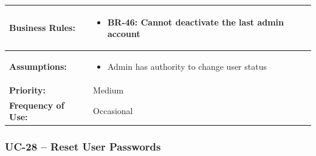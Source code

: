 \documentclass[12pt,a4paper]{article}
\begin{document}
\begin{longtable}{|p{4.5cm}|p{10.5cm}|}
\hline
\textbf{Business Rules:} &
\begin{itemize}
  \item BR-46: Cannot deactivate the last admin account
\end{itemize} \\
\hline
\textbf{Assumptions:} &
\begin{itemize}
  \item Admin has authority to change user status
\end{itemize} \\
\hline
\textbf{Priority:} & Medium \\
\hline
\textbf{Frequency of Use:} & Occasional \\
\hline
\end{longtable}

\subsubsection{UC-28 – Reset User Passwords}
\end{document}
